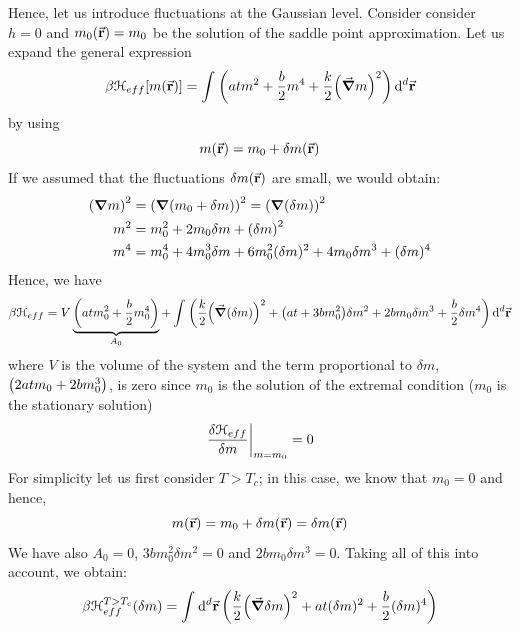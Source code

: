 \documentclass[../main/main.tex]{subfiles}
\begin{document}
Hence, let us introduce fluctuations at the Gaussian level. Consider consider \( h=0 \) and \( m_0 (\va{r})= m_0 \) be the solution of the saddle point approximation. Let us expand the general expression
\begin{equation*}
  \beta \mathcal{H}_{eff}  [m (\va{r})] = \int_{}^{}  \qty( a t m^2 + \frac{b}{2} m^4 + \frac{k}{2} \qty(\va{\grad } m)^2 ) \dd[d]{\va{r}}
\end{equation*}
by using
\begin{equation*}
  m(\va{r}) = m_0 + \delta m(\va{r})
\end{equation*}
If we assumed that the fluctuations \(  \delta m(\va{r})\) are small, we would obtain:
\begin{subequations}
\begin{align*}
   \qty(\grad m)^2 &= \qty(\grad \qty(m_0 + \delta m) )^2 = \qty(\grad \qty(\delta m) )^2  \\
     m^2 &= m_0^2 + 2 m_0 \delta m + \qty(\delta m)^2 \\
     m^4 &= m_0^4 + 4 m_0^3 \delta m + 6 m_0^2 (\delta m)^2 + 4 m_0 \delta m^3 + (\delta m)^4
\end{align*}
\end{subequations}
Hence, we have
\begin{equation}
  \beta \mathcal{H}_{eff} = V \underbrace{ \qty(a t m_0^2 + \frac{b}{2} m_0^4) }_{A_0}
  + \int_{}^{} \qty(\frac{k}{2}\qty( \va{\grad } (\delta m))^2 + \qty(a t + 3 b m_0^2)\delta  m^2 + 2 b m_0 \delta m^3 + \frac{b}{2} \delta m^4 )\dd[d]{\va{r}}
\end{equation}
where \( V \) is the volume of the system and the term proportional to \( \delta m \),  \( \qty( 2 a t m_0  +  2b m_0^3 )  \), is zero since \( m_0 \) is the solution of the extremal condition (\( m_0 \) is the stationary solution)
\begin{equation*}
  \eval{\frac{\delta \mathcal{H}_{eff}}{\delta m}}_{m=m_0} = 0
\end{equation*}
For simplicity let us first consider \( T>T_c \); in this case, we know that \( m_0 = 0 \) and hence,
\begin{equation*}
   m (\va{r}) = m_0 + \delta m(\va{r}) = \delta m (\va{r})
\end{equation*}
We have also \( A_0 =0 \),  \( 3bm_0^2 \delta m^2 = 0 \) and \( 2 b m_0 \delta m^3 = 0 \). Taking all of this into account, we obtain:
\begin{equation*}
  \beta \mathcal{H}_{eff}^{T>T_c} (\delta m)= \int_{}^{} \dd[d]{\va{r}} \qty(\frac{k}{2} \qty(\va{\grad }\delta m)^2 + a t (\delta m)^2 + \frac{b}{2} (\delta m)^4 )
\end{equation*}
\end{document}
